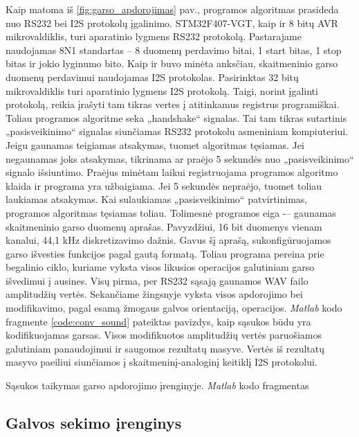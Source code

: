 \documentclass[]{vgtuef}
\begin{document}
{Kaip matoma iš \ref{fig:garso_apdorojimas} pav., programos algoritmas prasideda nuo RS232 bei I2S protokolų įgalinimo. STM32F407-VGT, kaip ir 8 bitų AVR mikrovaldiklis, turi aparatinio lygmens RS232 protokolą. Pastarajame naudojamas 8N1 standartas – 8 duomenų perdavimo bitai, 1 start bitas, 1 stop bitas ir jokio lyginumo bito. Kaip ir buvo minėta anksčiau, skaitmeninio garso duomenų perdavimui naudojamas I2S protokolas. Pasirinktas 32 bitų mikrovaldiklis turi aparatinio lygmens I2S protokolą. Taigi, norint įgalinti protokolą, reikia įrašyti tam tikras vertes į atitinkamus registrus programiškai. Toliau programos algoritme seka „handshake“ signalas. Tai tam tikras sutartinis „pasisveikinimo“ signalas siunčiamas RS232 protokolu asmeniniam kompiuteriui. Jeigu gaunamas teigiamas atsakymas, tuomet algoritmas tęsiamas. Jei negaunamas joks atsakymas, tikrinama ar praėjo 5 sekundės nuo „pasisveikinimo“ signalo išsiuntimo. Praėjus minėtam laikui registruojama programos algoritmo klaida ir programa yra užbaigiama. Jei 5 sekundės nepraėjo, tuomet toliau laukiamas atsakymas. Kai sulaukiamas „pasisveikinimo“ patvirtinimas, programos algoritmas tęsiamas toliau. Tolimesnė programos eiga -– gaunamas skaitmeninio garso duomenų aprašas. Pavyzdžiui, 16 bit duomenys vienam kanalui, 44,1 kHz diskretizavimo dažnis. Gavus šį aprašą, sukonfigūruojamos garso išvesties funkcijos pagal gautą formatą. Toliau programa pereina prie begalinio ciklo, kuriame vyksta visos likusios operacijos galutiniam garso išvedimui į ausines. Visų pirma, per RS232 sąsają gaunamos WAV failo amplitudžių vertės. Sekančiame žingsnyje vyksta visos apdorojimo bei modifikavimo, pagal esamą žmogaus galvos orientaciją, operacijos. \textit{Matlab} kodo fragmente \ref{code:conv_sound} pateiktas pavizdys, kaip sąsukos būdu yra kodifikuojamas garsas. Visos modifikuotos amplitudžių vertės paruošiamos galutiniam panaudojimui ir saugomos rezultatų masyve. Vertės iš rezultatų masyvo paeiliui siunčiamos į skaitmeninį-analoginį keitiklį I2S protokolui.

\begin{cfigure}
  \centering
  \caption{Sąsukos taikymas garso apdorojimo įrenginyje. \textit{Matlab} kodo fragmentas}
  \label{code:conv_sound}
  
\end{cfigure}

\newpage

\subsection{Galvos sekimo įrenginys}

}
\end{document}
